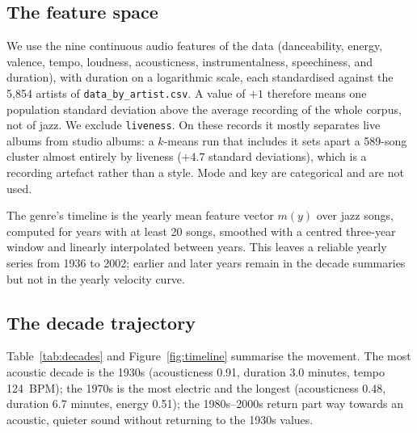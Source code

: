 \documentclass[11pt]{article}
\begin{document}
\subsection{The feature space}
We use the nine continuous audio features of the data (danceability, energy, valence, tempo,
loudness, acousticness, instrumentalness, speechiness, and duration), with duration on a
logarithmic scale, each standardised against the 5,854 artists of \texttt{data\_by\_artist.csv}.
A value of $+1$ therefore means one population standard deviation above the average recording of
the whole corpus, not of jazz.
We exclude \texttt{liveness}. On these records it mostly separates live albums from studio albums:
a $k$-means run that includes it sets apart a 589-song cluster almost entirely by
liveness ($+4.7$ standard deviations), which is a recording artefact rather than a style.
Mode and key are categorical and are not used.

The genre's timeline is the yearly mean feature vector $m(y)$ over jazz songs, computed for years
with at least 20 songs, smoothed with a centred three-year window and linearly interpolated
between years.
This leaves a reliable yearly series from 1936 to 2002; earlier and later years remain
in the decade summaries but not in the yearly velocity curve.

\subsection{The decade trajectory}
Table~\ref{tab:decades} and Figure~\ref{fig:timeline} summarise the movement.
The most acoustic decade is the 1930s (acousticness 0.91, duration 3.0 minutes, tempo 124~BPM);
the 1970s is the most electric and the longest (acousticness 0.48, duration 6.7 minutes, energy
0.51); the 1980s--2000s return part way towards an acoustic, quieter sound without returning to the
1930s values.
\end{document}
